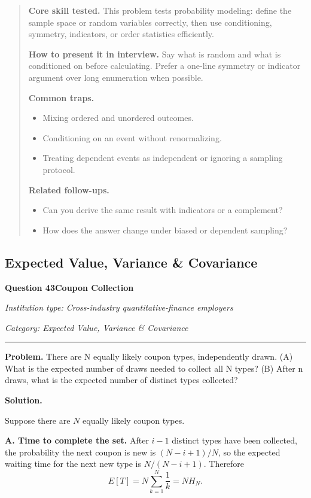 \documentclass[11pt,letterpaper,openany]{book}
\newenvironment{EditorialNote}
  {\begin{quote}\small\setlength{\parskip}{0.25em}}
  {\end{quote}}
\newcommand{\QuestionSpacer}{\vspace{0.4em}}
\newcommand{\FoundationQuestionHeader}[3]{%
  \vspace{1.0em}%
  {\large\bfseries #1\enspace #2\par}%
  {\small\itshape Institution type: Cross-industry quantitative-finance employers\par}%
  {\small\itshape Category: #3\par}%
  \vspace{0.25em}\hrule\vspace{0.45em}%
}
\begin{document}
\begin{EditorialNote}


\textbf{Core skill tested.} This problem tests probability modeling: define the sample space or random variables correctly, then use conditioning, symmetry, indicators, or order statistics efficiently.


\textbf{How to present it in interview.} Say what is random and what is conditioned on before calculating. Prefer a one-line symmetry or indicator argument over long enumeration when possible.


\textbf{Common traps.}
\begin{itemize}
\item Mixing ordered and unordered outcomes.
\item Conditioning on an event without renormalizing.
\item Treating dependent events as independent or ignoring a sampling protocol.
\end{itemize}


\textbf{Related follow-ups.}
\begin{itemize}
\item Can you derive the same result with indicators or a complement?
\item How does the answer change under biased or dependent sampling?
\end{itemize}


\end{EditorialNote}
\QuestionSpacer

\subsection{Expected Value, Variance \& Covariance}

\FoundationQuestionHeader{Question 43}{Coupon Collection}{Expected Value, Variance \& Covariance}

\textbf{Problem.} There are N equally likely coupon types, independently drawn. (A) What is the expected number of draws needed to collect all N types? (B) After n draws, what is the expected number of distinct types collected?


\textbf{Solution.}

Suppose there are \(N\) equally likely coupon types.

\textbf{A. Time to complete the set.} After \(i-1\) distinct types have been collected, the probability the next coupon is new is \((N-i+1)/N\), so the expected waiting time for the next new type is \(N/(N-i+1)\). Therefore
\[
\boxed{E[T]=N\sum_{k=1}^{N}\frac1k=NH_N}.
\]
\end{document}
